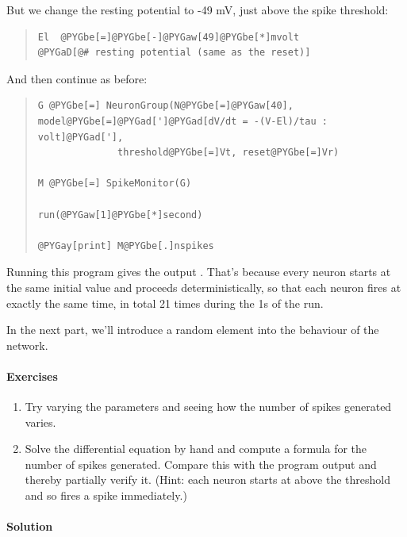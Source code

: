 \documentclass[letterpaper,10pt,english]{manual}
\begin{document}
But we change the resting potential to -49 mV, just above the
spike threshold:
\begin{quote}

\begin{Verbatim}[commandchars=@\[\]]
El  @PYGbe[=]@PYGbe[-]@PYGaw[49]@PYGbe[*]mvolt          @PYGaD[@# resting potential (same as the reset)]
\end{Verbatim}
\end{quote}

And then continue as before:
\begin{quote}

\begin{Verbatim}[commandchars=@\[\]]
G @PYGbe[=] NeuronGroup(N@PYGbe[=]@PYGaw[40], model@PYGbe[=]@PYGad[']@PYGad[dV/dt = -(V-El)/tau : volt]@PYGad['],
              threshold@PYGbe[=]Vt, reset@PYGbe[=]Vr)

M @PYGbe[=] SpikeMonitor(G)

run(@PYGaw[1]@PYGbe[*]second)

@PYGay[print] M@PYGbe[.]nspikes
\end{Verbatim}
\end{quote}

Running this program gives the output . That's because
every neuron starts at the same initial value and proceeds
deterministically, so that each neuron fires at exactly the
same time, in total 21 times during the 1s of the run.

In the next part, we'll introduce a random element into the
behaviour of the network.


\paragraph{Exercises}
\begin{enumerate}
\item {} 
Try varying the parameters and seeing how the number of
spikes generated varies.

\item {} 
Solve the differential equation by hand and compute a
formula for the number of spikes generated. Compare this
with the program output and thereby partially verify it.
(Hint: each neuron starts at above the threshold and so
fires a spike immediately.)

\end{enumerate}


\paragraph{Solution}
\end{document}
